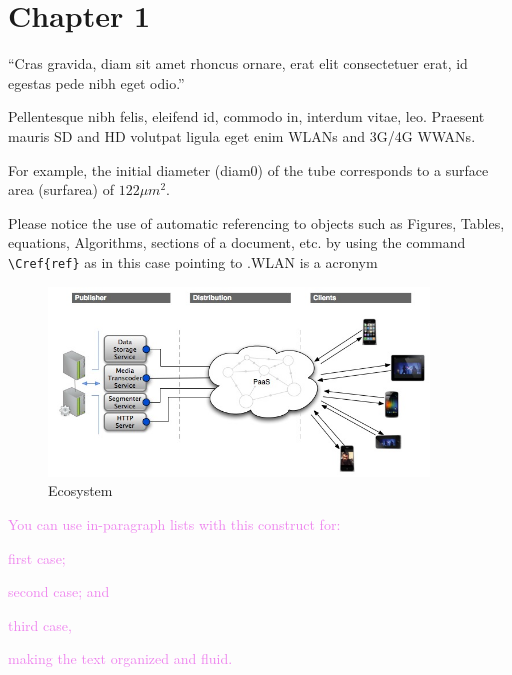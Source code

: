 \cleardoublepage
\label{chap:sintax}

\section{Chapter 1}

\enquote{Cras gravida, diam sit amet rhoncus ornare, erat elit consectetuer erat, id egestas pede nibh eget odio.}

Pellentesque nibh felis, eleifend id, commodo in, interdum vitae, leo. 
 Praesent mauris \ac{SD} and \ac{HD} volutpat ligula eget enim \acp{WLAN} and 3G\slash 4G \acp{WWAN}.


For example, the initial diameter (\gls{diam0}) of the tube corresponds to a surface area (\gls{surfarea}) of $122 \mu{m}^2$.

 
Please notice the use of automatic referencing to objects such as Figures, Tables, equations, Algorithms, sections of a document, etc. by using the command \verb:\Cref{ref}: as in this case pointing to .\ac{WLAN} is a acronym

\begin{figure}[htb]
\centering
\includegraphics[width=0.9\textwidth]{./Images/cashed5}
\caption{Ecosystem}
\label{fig:cashed}
\end{figure}


\textcolor{violet}{You can use in-paragraph lists with this construct for: 
\begin{inparaenum}[(a)]
\item first case;
\item second case; and
\item third case,
\end{inparaenum}
making the text organized and fluid.}

